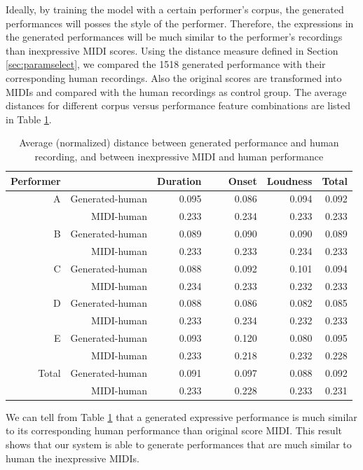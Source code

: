 Ideally, by training the model with a certain performer's corpus, the generated performances will posses the style of the performer. Therefore, the expressions in the generated performances will be much similar to the performer's recordings than inexpressive MIDI scores. Using the distance measure defined in Section \ref{sec:paramselect}, we compared the 1518 generated performance with their corresponding human recordings. Also the original scores are transformed into MIDIs and compared with the human recordings as control group. The average distances for different corpus versus performance feature combinations are listed in Table \ref{tab:corr}.
\begin{table}
   \centering
   \caption{Average (normalized) distance between generated performance and human recording, and between inexpressive MIDI and human performance}
   \label{tab:corr}
   \begin{tabular}{rr|rrr|r}
\hline
Performer&&Duration&\ \ \ Onset&Loudness&Total\\
\hline
A&Generated-human&0.095&0.086&0.094&0.092\\
&MIDI-human&0.233&0.234&0.233&0.233\\
\hline
B&Generated-human&0.089&0.090&0.090&0.089\\
&MIDI-human&0.233&0.233&0.234&0.233\\
\hline
C&Generated-human&0.088&0.092&0.101&0.094\\
&MIDI-human&0.234&0.233&0.232&0.233\\
\hline
D&Generated-human&0.088&0.086&0.082&0.085\\
&MIDI-human&0.233&0.234&0.232&0.233\\
\hline
E&Generated-human&0.093&0.120&0.080&0.095\\
&MIDI-human&0.233&0.218&0.232&0.228\\
\hline
Total&Generated-human&0.091&0.097&0.088&0.092\\
&MIDI-human&0.233&0.228&0.233&0.231\\
\hline
   \end{tabular}
\end{table}

We can tell from Table \ref{tab:corr} that a generated expressive performance is much similar to its corresponding human performance than original score MIDI. This result shows that our system is able to generate performances that are much similar to human the inexpressive MIDIs.

